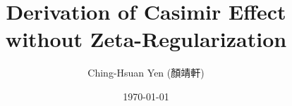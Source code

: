 \documentclass[twocolumn]{revtex4-2}
\begin{document}
\title{Derivation of Casimir Effect without Zeta-Regularization}
\author{Ching-Hsuan Yen (顏靖軒)}
\date{\today}
\begin{abstract}
    
\end{abstract}
\maketitle





\end{document}

